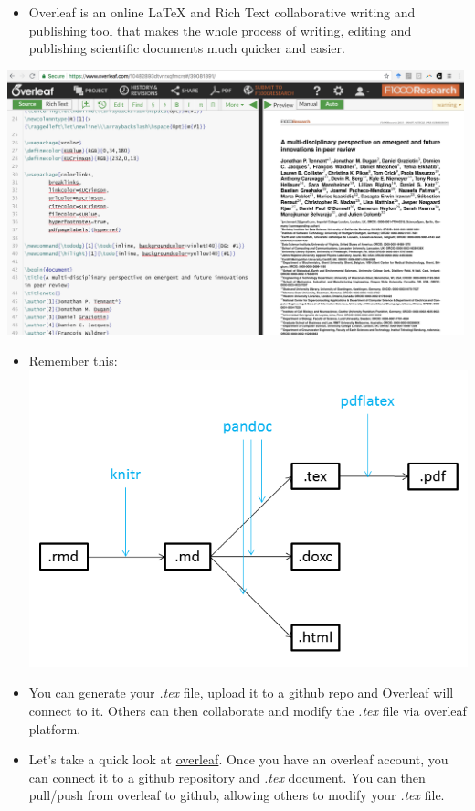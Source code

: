 \documentclass[]{article}
\providecommand{\tightlist}{%
  \setlength{\itemsep}{0pt}\setlength{\parskip}{0pt}}
\begin{document}
\begin{itemize}
\tightlist
\item
  Overleaf is an online LaTeX and Rich Text collaborative writing and
  publishing tool that makes the whole process of writing, editing and
  publishing scientific documents much quicker and easier.
\end{itemize}

\includegraphics[width=5.20833in,height=\textheight]{../figures/overleaf.png}

\begin{itemize}
\item
  Remember this:\\
  \includegraphics[width=5.20833in,height=\textheight]{../figures/pandoc1.png}
\item
  You can generate your \emph{.tex} file, upload it to a github repo and
  Overleaf will connect to it. Others can then collaborate and modify
  the \emph{.tex} file via overleaf platform.
\item
  Let's take a quick look at \href{https://www.overleaf.com/}{overleaf}.
  Once you have an overleaf account, you can connect it to a
  \href{https://www.github.com/}{github} repository and \emph{.tex}
  document. You can then pull/push from overleaf to github, allowing
  others to modify your \emph{.tex} file.
\end{itemize}
\end{document}
